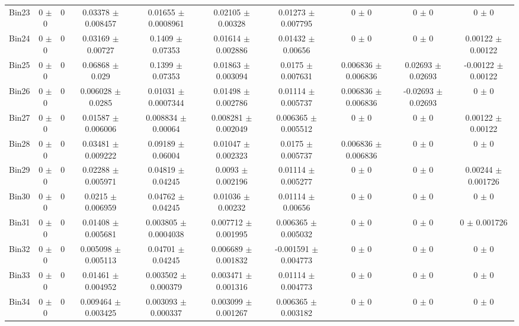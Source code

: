 \begin{tabular}{@{\extracolsep{4pt}}lccccccccc@{}}
     Bin23 & 0 $\pm$ 0 & 0 & 0.03378 $\pm$ 0.008457 & 0.01655 $\pm$ 0.0008961 & 0.02105 $\pm$ 0.00328 & 0.01273 $\pm$ 0.007795 & 0 $\pm$ 0 & 0 $\pm$ 0 & 0 $\pm$ 0 \\ 
     Bin24 & 0 $\pm$ 0 & 0 & 0.03169 $\pm$ 0.00727 & 0.1409 $\pm$ 0.07353 & 0.01614 $\pm$ 0.002886 & 0.01432 $\pm$ 0.00656 & 0 $\pm$ 0 & 0 $\pm$ 0 & 0.00122 $\pm$ 0.00122 \\ 
     Bin25 & 0 $\pm$ 0 & 0 & 0.06868 $\pm$ 0.029 & 0.1399 $\pm$ 0.07353 & 0.01863 $\pm$ 0.003094 & 0.0175 $\pm$ 0.007631 & 0.006836 $\pm$ 0.006836 & 0.02693 $\pm$ 0.02693 & -0.00122 $\pm$ 0.00122 \\ 
     Bin26 & 0 $\pm$ 0 & 0 & 0.006028 $\pm$ 0.0285 & 0.01031 $\pm$ 0.0007344 & 0.01498 $\pm$ 0.002786 & 0.01114 $\pm$ 0.005737 & 0.006836 $\pm$ 0.006836 & -0.02693 $\pm$ 0.02693 & 0 $\pm$ 0 \\ 
     Bin27 & 0 $\pm$ 0 & 0 & 0.01587 $\pm$ 0.006006 & 0.008834 $\pm$ 0.00064 & 0.008281 $\pm$ 0.002049 & 0.006365 $\pm$ 0.005512 & 0 $\pm$ 0 & 0 $\pm$ 0 & 0.00122 $\pm$ 0.00122 \\ 
     Bin28 & 0 $\pm$ 0 & 0 & 0.03481 $\pm$ 0.009222 & 0.09189 $\pm$ 0.06004 & 0.01047 $\pm$ 0.002323 & 0.0175 $\pm$ 0.005737 & 0.006836 $\pm$ 0.006836 & 0 $\pm$ 0 & 0 $\pm$ 0 \\ 
     Bin29 & 0 $\pm$ 0 & 0 & 0.02288 $\pm$ 0.005971 & 0.04819 $\pm$ 0.04245 & 0.0093 $\pm$ 0.002196 & 0.01114 $\pm$ 0.005277 & 0 $\pm$ 0 & 0 $\pm$ 0 & 0.00244 $\pm$ 0.001726 \\ 
     Bin30 & 0 $\pm$ 0 & 0 & 0.0215 $\pm$ 0.006959 & 0.04762 $\pm$ 0.04245 & 0.01036 $\pm$ 0.00232 & 0.01114 $\pm$ 0.00656 & 0 $\pm$ 0 & 0 $\pm$ 0 & 0 $\pm$ 0 \\ 
     Bin31 & 0 $\pm$ 0 & 0 & 0.01408 $\pm$ 0.005681 & 0.003805 $\pm$ 0.0004038 & 0.007712 $\pm$ 0.001995 & 0.006365 $\pm$ 0.005032 & 0 $\pm$ 0 & 0 $\pm$ 0 & 0 $\pm$ 0.001726 \\ 
     Bin32 & 0 $\pm$ 0 & 0 & 0.005098 $\pm$ 0.005113 & 0.04701 $\pm$ 0.04245 & 0.006689 $\pm$ 0.001832 & -0.001591 $\pm$ 0.004773 & 0 $\pm$ 0 & 0 $\pm$ 0 & 0 $\pm$ 0 \\ 
     Bin33 & 0 $\pm$ 0 & 0 & 0.01461 $\pm$ 0.004952 & 0.003502 $\pm$ 0.000379 & 0.003471 $\pm$ 0.001316 & 0.01114 $\pm$ 0.004773 & 0 $\pm$ 0 & 0 $\pm$ 0 & 0 $\pm$ 0 \\ 
     Bin34 & 0 $\pm$ 0 & 0 & 0.009464 $\pm$ 0.003425 & 0.003093 $\pm$ 0.000337 & 0.003099 $\pm$ 0.001267 & 0.006365 $\pm$ 0.003182 & 0 $\pm$ 0 & 0 $\pm$ 0 & 0 $\pm$ 0 \\ 

\end{tabular}

